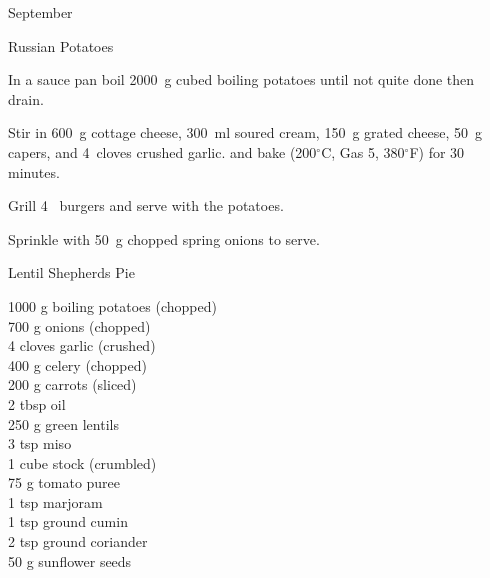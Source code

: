 \begin{menu}{September}
\begin{recipe}{2}{Russian Potatoes}
\begin{ingredients}
		\end{ingredients}
	
	
    \begin{instructions}
    \item 
        In a sauce pan boil
        2000~g cubed boiling potatoes
        until not quite done
        then drain.
      \item 
        Stir in
        600~g  cottage cheese,
        300~ml  soured cream,
        150~g grated cheese,
        50~g  capers,
        and
        4~cloves crushed garlic.
        and bake (200$^{\circ}$C, Gas 5, 380$^{\circ}$F) for 30 minutes.
      \item 
        Grill 4~  burgers and serve with the potatoes.
      \item 
        Sprinkle with
        50~g chopped spring onions
        to serve.
      
    \end{instructions}
    \end{recipe}%
  
    \begin{recipe}{2}{Lentil Shepherds Pie}%
		\begin{ingredients}
		1000 g boiling potatoes (chopped) \\
	700 g onions (chopped) \\
	4 cloves garlic (crushed) \\
	400 g celery (chopped) \\
	200 g carrots (sliced) \\
	2 tbsp oil  \\
	250 g green lentils  \\
	3 tsp miso  \\
	1 cube stock (crumbled) \\
	75 g tomato puree  \\
	1 tsp marjoram  \\
	1 tsp ground cumin  \\
	2 tsp ground coriander  \\
	50 g sunflower seeds  \\
	
		\end{ingredients}
	
	
	

\end{recipe}
\end{menu}
